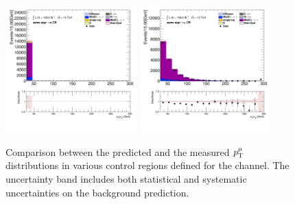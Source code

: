 \begin{figure}[!htp]
\begin{center}
			\includegraphics[width=0.45\textwidth]{chapters/chapter6_HPlus/images/taulep/mu_0_pt_SS_TAUEL.png} 
			\includegraphics[width=0.45\textwidth]{chapters/chapter6_HPlus/images/taulep/mu_0_pt_SS_TAUMU.png} \\
			\end{center}
			\caption{
			Comparison between the predicted and the measured $p_{\text{T}}^{\mu}$ distributions in various control regions defined for the \taulep channel. The uncertainty band includes both statistical and systematic uncertainties on the background prediction. 
			}
			\label{fig:bkg-pt-mu-taulep}
		\end{figure}

